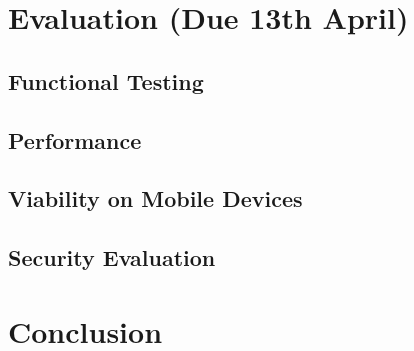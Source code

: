 \documentclass[12pt,a4paper,twoside,openright]{report}
\begin{document}

\chapter{Evaluation (Due 13th April)}




\section{Functional Testing}

\section{Performance}

\section{Viability on Mobile Devices}

\section{Security Evaluation}


\chapter{Conclusion}
\end{document}
